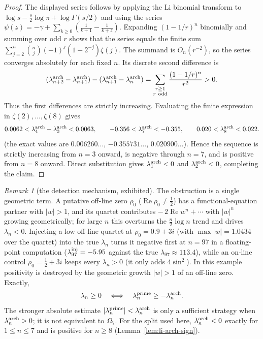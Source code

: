 \documentclass[11pt]{amsart}
\theoremstyle{definition}
\theoremstyle{remark}
\newtheorem{remark}[theorem]{Remark}
\theoremstyle{definition}
\renewcommand{\Re}{\operatorname{Re}}
\begin{document}
\begin{proof}
The displayed series follows by applying the Li binomial transform to
$\log s-\tfrac s2\log\pi+\log\Gamma(s/2)$ and using the series $\psi(z)=-\gamma+\sum_{k\ge0}(\frac1{k+1}-\frac1{k+z})$.  Expanding
$(1-1/r)^n$ binomially and summing over odd $r$ shows that the series equals the finite sum
$\sum_{j=2}^{n}\binom nj(-1)^j(1-2^{-j})\zeta(j)$.  The
summand is $O_n(r^{-2})$, so the series converges absolutely for each fixed $n$.  Its discrete second
difference is
\[
  (\lambda_{n+2}^{\rm arch}-\lambda_{n+1}^{\rm arch})
  -(\lambda_{n+1}^{\rm arch}-\lambda_n^{\rm arch})
  =\sum_{\substack{r\ge1\\r\ \mathrm{odd}}}
     \frac{(1-1/r)^n}{r^2}>0.
\]
Thus the first differences are strictly increasing.  Evaluating the finite expression in
$\zeta(2),\ldots,\zeta(8)$ gives
\[
  0.0062<\lambda_4^{\rm arch}-\lambda_3^{\rm arch}<0.0063,
  \qquad -0.356<\lambda_7^{\rm arch}<-0.355,
  \qquad 0.020<\lambda_8^{\rm arch}<0.022.
\]
(the exact values are $0.006260\ldots$, $-0.355731\ldots$, $0.020900\ldots$).  Hence the sequence is strictly increasing from $n=3$ onward, is negative
through $n=7$, and is positive from $n=8$ onward.  Direct substitution gives
$\lambda_1^{\rm arch}<0$ and $\lambda_2^{\rm arch}<0$, completing the claim.
\end{proof}

\begin{remark}[the detection mechanism, exhibited]\label{rmk:li-detection}
The obstruction is a single geometric term.  A putative off-line zero $\rho_0$ ($\Re\rho_0\ne\tfrac12$)
has a functional-equation partner with $|w|>1$, and its quartet contributes
$-\,2\Re w^n+\cdots$ with $|w|^n$ growing geometrically; for large $n$ this overturns the
$\tfrac n2\log n$ trend and drives $\lambda_n<0$.  Injecting a low off-line quartet at
$\rho_0=0.9+3i$ (with $\max|w|=1.0434$ over the quartet) into the true $\lambda_n$ turns it negative
first at $n=97$ in a floating-point computation ($\lambda_{97}^{\rm inj}=-5.95$ against the true $\lambda_{97}\approx113.4$), while an on-line
control $\rho_0=\tfrac12+3i$ keeps every $\lambda_n>0$ (it only adds $4\sin^2$).  In this example
positivity is destroyed by the geometric growth $|w|>1$ of an off-line zero.  Exactly,
\[
   \lambda_n\ge0
   \quad\Longleftrightarrow\quad
   \lambda_n^{\rm prime}\ge-\lambda_n^{\rm arch}.
\]
The stronger absolute estimate
$|\lambda_n^{\rm prime}|<\lambda_n^{\rm arch}$ is only a sufficient strategy when
$\lambda_n^{\rm arch}>0$; it is not equivalent to $\Omega_7$.  For the split used here,
$\lambda_n^{\rm arch}<0$ exactly for $1\le n\le7$ and is positive for $n\ge8$
(Lemma~\ref{lem:li-arch-sign}).
\end{remark}
\end{document}
